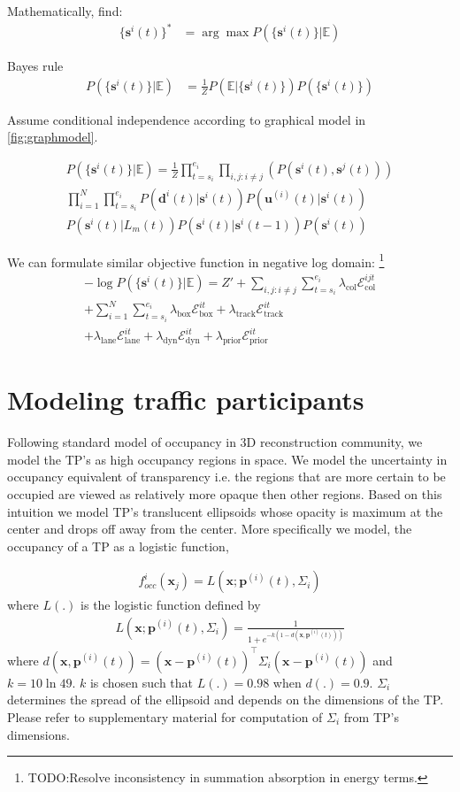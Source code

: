 \documentclass[10pt,twocolumn,letterpaper]{article}
\newcommand{\pos}[2]{\mathbf{p}^{(#1)}(#2)}
\newcommand{\state}[2]{\mathbf{s}^{#1}(#2)}
\newcommand{\trackp}[1]{\mathbf{u}^{(i)}(#1)}
\newcommand{\bb}[1]{\mathbf{d}^{#1}(t)}
\newcommand{\Energy}[1]{\mathcal{E}^{it}_{\text{#1}}}
\newcommand{\WEnergy}[1]{\lambda_{\text{#1}}\Energy{#1}}
\newcommand{\EnergyCol}{\mathcal{E}^{ijt}_{\text{col}}}
\newcommand{\WEnergyCol}{\lambda_{\text{col}}\EnergyCol}
\newcommand{\occf}{f^i_{occ}(\mathbf{x}_j)}
\begin{document}
Mathematically, find:
\begin{align}
  \{\state{i}{t}\}^* &= \arg \max P(\{\state{i}{t}\} | \mathbb{E})
\end{align}

Bayes rule
\begin{align}
  P(\{\state{i}{t}\} | \mathbb{E}) &=
  \frac{1}{Z}P( \mathbb{E} | \{\state{i}{t}\})P(\{\state{i}{t}\})
\end{align}


Assume conditional independence according to graphical model in
\ref{fig:graphmodel}.

\begin{multline}
  P(\{\state{i}{t}\} | \mathbb{E}) =
  \frac{1}{Z}
  \prod_{t=s_i}^{e_i}\prod_{i,j: i \ne j}(P(\state{i}{t}, \state{j}{t}))\\
%
  \prod_{i=1}^{N}
  \prod_{t=s_i}^{e_i}
  P(\bb{i} | \state{i}{t})
  P(\trackp{t} | \state{i}{t})\\
  P(\state{i}{t} | L_m(t))
  P(\state{i}{t} | \state{i}{t-1})
  P(\state{i}{t})
\end{multline}

We can formulate similar objective function in negative log domain:
\footnote{TODO:Resolve inconsistency in summation absorption in energy terms.}
\begin{multline}
  -\log{P(\{\state{i}{t}\} | \mathbb{E})} = 
  Z' + \sum_{i,j:i\ne j} \sum_{t=s_i}^{e_i}  \WEnergyCol \\
  + \sum_{i=1}^N \sum_{t=s_i}^{e_i}
    \WEnergy{box}
  + \WEnergy{track}\\
  + \WEnergy{lane}
  + \WEnergy{dyn}
  + \WEnergy{prior}
\end{multline}

\section{Modeling traffic participants}
\label{sec:TPmodel}
Following standard model of occupancy in 3D reconstruction community, we model
the TP's as high occupancy regions in space. We model the
uncertainty in occupancy equivalent of transparency i.e. the regions that are
more certain to be occupied are viewed as relatively more opaque then other
regions. Based on this intuition we model TP's translucent
ellipsoids whose opacity is maximum at the center and drops off away from the
center. More specifically we model, the occupancy of a TP as a
logistic function, 

\begin{align}
   \occf = L(\mathbf{x}; \pos{i}{t}, \Sigma_i)
\end{align}
where $L(.)$ is the logistic function defined by
\begin{align}
  L(\mathbf{x}; \pos{i}{t}, \Sigma_i) = \frac{1}{
    1 + e^{-k(1 - d(\mathbf{x},\pos{i}{t}))}
    }
\end{align}
where $d(\mathbf{x},\pos{i}{t}) =
(\mathbf{x}-\pos{i}{t})^\top\Sigma_i(\mathbf{x}-\pos{i}{t})$ and $k =
10\ln{49}$. $k$ is chosen such that $L(.) = 0.98$ when $d(.) =
0.9$. $\Sigma_i$ determines the spread of the ellipsoid and depends on the
dimensions of the TP. Please refer to supplementary material 
for computation of $\Sigma_i$ from TP's dimensions.
\end{document}
